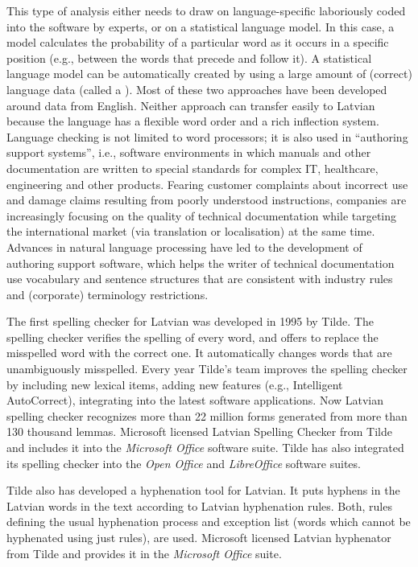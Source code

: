 \begin{multicols}{2}
This type of analysis either needs to draw on language-specific  laboriously coded into the software by experts, or on a statistical language model.
In this case, a model calculates the probability of a particular word as it occurs in a specific position (e.g., between the words that precede and follow it).
A statistical language model can be automatically created by using a large amount of (correct) language data (called a ).
Most of these two approaches have been developed around data from English.
Neither approach can transfer easily to Latvian because the language has a flexible word order and a rich inflection system. 
Language checking is not limited to word processors; it is also used in ``authoring support systems'', i.e., software environments in which manuals and other documentation are written to special standards for complex IT, healthcare, engineering and other products.
Fearing customer complaints about incorrect use and damage claims resulting from poorly understood instructions, companies are increasingly focusing on the quality of technical documentation while targeting the international market (via translation or localisation) at the same time.
Advances in natural language processing have led to the development of authoring support software, which helps the writer of technical documentation use vocabulary and sentence structures that are consistent with industry rules and (corporate) terminology restrictions.

The first spelling checker for Latvian was developed in 1995 by Tilde.
The spelling checker verifies the spelling of every word, and offers to replace the misspelled word with the correct one.
It automatically changes words that are unambiguously misspelled.
Every year Tilde's team improves the spelling checker by including new lexical items, adding new features (e.g., Intelligent AutoCorrect), integrating into the latest software applications.
Now Latvian spelling checker recognizes more than 22 million forms generated from more than 130 thousand lemmas.
Microsoft licensed Latvian Spelling Checker from Tilde and includes it into the \textit{Microsoft Office }software suite.
Tilde has also integrated its spelling checker into the \textit{Open Office }and\textit{ LibreOffice} software suites.

Tilde also has developed a hyphenation tool for Latvian.
It puts hyphens in the Latvian words in the text according to Latvian hyphenation rules.
Both, rules defining the usual hyphenation process and exception list (words which cannot be hyphenated using just rules), are used.
Microsoft licensed Latvian hyphenator from Tilde and provides it in the \textit{Microsoft Office }suite.


\end{multicols}
